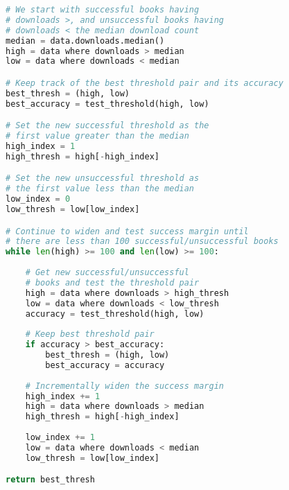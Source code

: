 \begin{lstlisting}[language=Python, escapechar=!, caption={\small{Threshold Search Algorithm}}, label={thresh_algo}]
# We start with successful books having 
# downloads >, and unsuccessful books having
# downloads < the median download count
median = data.downloads.median()
high = data where downloads > median
low = data where downloads < median

# Keep track of the best threshold pair and its accuracy
best_thresh = (high, low)
best_accuracy = test_threshold(high, low)

# Set the new successful threshold as the 
# first value greater than the median
high_index = 1
high_thresh = high[-high_index]

# Set the new unsuccessful threshold as
# the first value less than the median
low_index = 0
low_thresh = low[low_index]

# Continue to widen and test success margin until 
# there are less than 100 successful/unsuccessful books
while len(high) >= 100 and len(low) >= 100:
    
    # Get new successful/unsuccessful
    # books and test the threshold pair
    high = data where downloads > high_thresh
    low = data where downloads < low_thresh
    accuracy = test_threshold(high, low)
    
    # Keep best threshold pair
    if accuracy > best_accuracy:
        best_thresh = (high, low)
        best_accuracy = accuracy
    
    # Incrementally widen the success margin
    high_index += 1
    high = data where downloads > median
    high_thresh = high[-high_index]
    
    low_index += 1
    low = data where downloads < median
    low_thresh = low[low_index]

return best_thresh
\end{lstlisting}
        
        
        
